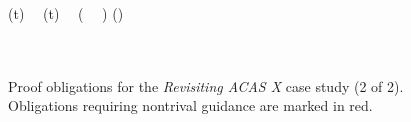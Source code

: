 \begin{figure}[p]
\begin{center}
\begin{sllisting}
  \slind \cahint(t) \ge \cahintmin \, \land \, \cavint(t) \ge \cavintmin \, \land \, (\cacmin {} \, \lor \, \cahzerointmin {}) \limply \cahint(\catm) \ge \cahmintmin\\
  \hspace{0.5em}\text{--}\hspace{0.4em}\color{red}{\Init \, \land \, \Inv \, \land \, \cahmintmin = \cahintmin + \cavintmin (\catm - t) \, \land \, c \ge \cacmin \, \land \, \cahint(0) \ge \cahzerointmin \, \land \, \cahint(t) \ge \cahintmin \, \land \, }\\
  \slind \color{red}{\cavint(t) \ge \cavintmin \, \land \, \cacmin > 0 \, \land \, \cahzerointmin > 0 \limply \cahint(\catm) \ge \cahmintmin}\\
\end{sllisting}
\end{center}
\caption{Proof obligations for the \emph{Revisiting ACAS X} case study (2 of 2). Obligations requiring nontrival guidance are marked in red.}
\label{fig:targets-revisiting-ACAS-X}
\Description[]{}
\end{figure}
